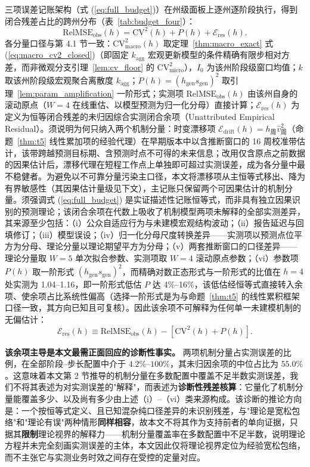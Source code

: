 \documentclass[10pt,a4paper]{article}
\theoremstyle{plain}
\theoremstyle{definition}
\begin{document}
三项误差记账架构（式 (\ref{eq:full_budget})）在州级面板上逐州逐阶段执行，得到闭合残差占比的跨州分布（表~\ref{tab:budget_four}）：
\begin{equation}
\text{RelMSE}_{\text{obs}}(h) = \text{CV}^2(h) + P(h) + \mathcal{E}_{\text{res}}(h).
\label{eq:full_budget}
\end{equation}
各分量口径与第 4.1 节一致：$\text{CV}^2_{\text{macro}}(h)$ 取定理~\ref{thm:macro_exact} 式 (\ref{eq:macro_cv2_closed})（即固定 $k_{\text{agg}}$ 宏观更新模型的条件精确有限步相对方差，而非微观分支引理~\ref{lem:cv_floor} 的 $\text{CV}^2_{\text{micro}}$），$I_0$ 为该州阶段级窗口均值；$k$ 取该州阶段级宏观聚合离散度 $k_{\text{agg}}$；$P(h) = (h_{\text{gen}} s_{\text{gen}})^2$ 取引理~\ref{lem:param_amplification} 一阶形式；实测项 $\text{RelMSE}_{\text{obs}}(h)$ 由该州自身的滚动原点（$W=4$ 在线重估、以模型预测为归一化分母）直接计算；$\mathcal{E}_{\text{res}}(h)$ 为定义为恒等闭合残差的未归因综合实测闭合余项（Unattributed Empirical Residual）。须说明为何只纳入两个机制分量：时变漂移项 $\mathcal{E}_{\text{drift}}(h) = h_{\text{周}}\widehat{v}^2_{\text{周}}$（命题~\ref{thm:t5} 线性累加项的经验代理）在早期版本中以含推断窗口的 16 周校准带估计，该带跨越预测目标期、含预测时点不可得的未来信息；改用仅含原点之前数据的因果估计后，漂移代理在短程工作点上单独即可超过实测误差，成为各分量中最不稳健者。为避免以不可靠分量污染主口径，本文将漂移项从主恒等式移出、降为有界敏感性（其因果估计量级见下文），主记账只保留两个可因果估计的机制分量。须强调式 (\ref{eq:full_budget}) 是实证描述性记账恒等式，而非具有独立因果识别的预测理论；该闭合余项在代数上吸收了机制模型两项未解释的全部实测差异，其来源至少包括：（i）公众自适应行为与未建模宏观结构波动；（ii）报告延迟与回填修订；（iii）模型误设；（iv）归一化分母尺度转换差异——实测项以预测点位平方为分母、理论分量以理论期望平方为分母；（v）两套推断窗口的口径差异——理论分量取 $W=5$ 单次拟合参数、实测项取 $W=4$ 滚动原点参数；（vi）参数项 $P(h)$ 取一阶形式 $(h_{\text{gen}}s_{\text{gen}})^2$，而精确对数正态形式与一阶形式的比值在 $h=4$ 处实测为 1.04--1.16，即一阶形式低估 $P$ 达 4\%--16\%，该低估经恒等式直接转入余项、使余项占比系统性偏高（选择一阶形式是为与命题~\ref{thm:t5} 的线性累积框架口径一致，其方向已知且可复核）。因此该余项不可解释为任何单一未建模机制的无偏估计：
\begin{equation}
\mathcal{E}_{\text{res}}(h) \equiv \text{RelMSE}_{\text{obs}}(h) - \left[ \text{CV}^2(h) + P(h) \right].
\end{equation}

\textbf{该余项主导是本文最需正面回应的诊断性事实。} 两项机制分量占实测误差的比例，在全部阶段--步长配置中介于 $4.2\%$--$100\%$，其未归因余项的中位占比为 $55.0\%$。这意味着本文第 2 节推导的机制分量在多数配置中覆盖不足半数实测误差，我们不将其表述为对实测误差的"解释"，而表述为\textbf{诊断性残差核算}：它量化了机制分量能覆盖多少、以及尚有多少由上述（i）--（vi）类来源构成。该诊断的推论方向是：一个按恒等式定义、且已知混杂纯口径差异的未识别残差，与"理论是宽松包络"和"理论有误"两种情形\textbf{同样相容}，故本文不将其作为支持前者的单向证据，只据其\textbf{限制}理论视界的解释力——机制分量覆盖率在多数配置中不足半数，说明理论方程并未完全刻画实测误差的主体，本文因此仅将理论视界定位为经验宽松包络，而不主张它与实测业务时效之间存在受控的定量对应。
\end{document}
